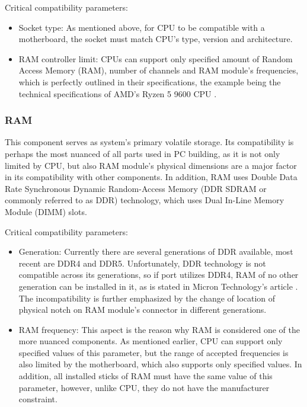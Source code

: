 Critical compatibility parameters:
\begin{itemize}
	\item Socket type: As mentioned above, for CPU to be compatible with a motherboard, the socket must match CPU's type, version and architecture.
	\item RAM controller limit: CPUs can support only specified amount of Random Access Memory (RAM), number of channels and RAM module's frequencies, which is perfectly outlined in their specifications, the example being the technical specifications of AMD's Ryzen 5 9600 CPU \cite{noauthor_ryzen_2025}.
\end{itemize}

\subsubsection{RAM}
This component serves as system's primary volatile storage.
Its compatibility is perhaps the most nuanced of all parts used in PC building, as it is not only limited by CPU, but also RAM module's physical dimensions are a major factor in its compatibility with other components.
In addition, RAM uses Double Data Rate Synchronous Dynamic Random-Access Memory (DDR SDRAM or commonly referred to as DDR) technology, which uses Dual In-Line Memory Module (DIMM) slots.

Critical compatibility parameters:
\begin{itemize}
	\item Generation: Currently there are several generations of DDR available, most recent are DDR4 and DDR5. 
	Unfortunately, DDR technology is not compatible across its generations, so if port utilizes DDR4, RAM of no other generation can be installed in it, as is stated in Micron Technology's article \cite{noauthor_whats_2025}.
	The incompatibility is further emphasized by the change of location of physical notch on RAM module's connector in different generations.
	\item RAM frequency: This aspect is the reason why RAM is considered one of the more nuanced components. 
	As mentioned earlier, CPU can support only specified values of this parameter, but the range of accepted frequencies is also limited by the motherboard, which also supports only specified values.
	In addition, all installed sticks of RAM must have the same value of this parameter, however, unlike CPU, they do not have the manufacturer constraint.
\end{itemize}

